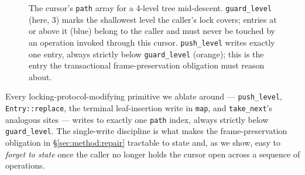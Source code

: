 \documentclass[10pt]{article}
\newcommand{\vfn}[1]{\texttt{#1}}
\begin{document}
\begin{figure}[h]
\centering
{}
\caption{The cursor's \vfn{path} array for a 4-level tree mid-descent.
\vfn{guard\_level} (here, 3) marks the shallowest level the caller's
lock covers; entries at or above it (blue) belong to the caller and
must never be touched by an operation invoked through this cursor.
\vfn{push\_level} writes exactly one entry, always strictly below
\vfn{guard\_level} (orange); this is the entry the transactional
frame-preservation obligation must reason about.}
\label{fig:cursor}
\end{figure}

Every locking-protocol-modifying primitive we ablate around ---
\vfn{push\_level}, \vfn{Entry::replace}, the terminal leaf-insertion
write in \vfn{map}, and \vfn{take\_next}'s analogous sites --- writes to
exactly one \vfn{path} index, always strictly below
\vfn{guard\_level}. The single-write discipline is what makes the
frame-preservation obligation in \S\ref{sec:method:repair} tractable to
state and, as we show, easy to \emph{forget to state} once the caller
no longer holds the cursor open across a sequence of operations.
\end{document}

